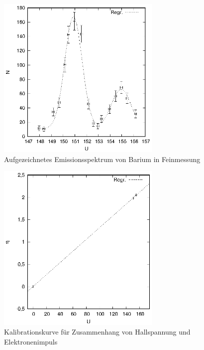 \begin{figure}[h]
  \centering
  \includegraphics[width=0.7\textwidth]{data/Ba_fein.eps}
  \caption{Aufgezeichnetes Emissionsspektrum von Barium in Feinmessung}
  \label{fig:ba_fein}
\end{figure}

\begin{figure}[h]
  \centering
  \includegraphics[width=0.7\textwidth]{data/kal.eps}
  \caption{Kalibrationskurve für Zusammenhang von Hallspannung und Elektronenimpuls}
  \label{fig:kal}
\end{figure}

